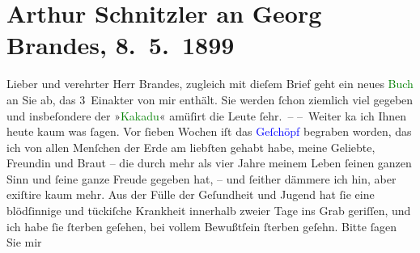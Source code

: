 

               \section[Arthur Schnitzler an Georg Brandes, 8. 5. 1899]{ Arthur Schnitzler an Georg Brandes, 8. 5. 1899}\nopagebreak{}\rehead{ }\normalsize\beginnumbering{} \toendnotes[C]{\smallbreak\pagebreak[2]} 
\toendnotes[C]{\smallbreak}\pstart{}{\pb}Lieber und verehrter Herr
                        Brandes,\pend\pstart
           zugleich mit dieſem Brief geht ein neues \textcolor{green}{Buch}{} an Sie ab, das 3 Einakter von mir enthält. Sie
                    werden ſchon ziemlich viel gegeben und insbeſondere der »\textcolor{green}{Kakadu}{}\ledrightnote{\textcolor{green}{Der grüne Kakadu. Groteske in einem Akt}}« amüſirt die Leute ſehr. –\pend
           \pstart
           – Weiter ka{\geminationn} ich Ihnen heute kaum was ſagen. Vor
                    ſieben Wochen iſt das \textcolor{blue}{Geſchöpf}{} begraben worden, das ich von allen {\pb}Menſchen der Erde am liebſten gehabt
                    habe, meine Geliebte, Freundin und Braut – die durch mehr als vier Jahre meinem
                    Leben ſeinen ganzen Sinn und ſeine ganze Freude gegeben hat, – und ſeither
                    dämmere ich hin, aber exiſtire kaum mehr. Aus der Fülle der Geſundheit und
                    Jugend hat ſie eine blödſinnige und tückiſche Krankheit innerhalb zweier Tage
                    ins Grab geriſſen, und ich habe ſie ſterben geſehen, bei vollem Bewußt{\pb}ſein ſterben geſehn. Bitte ſagen Sie mir
